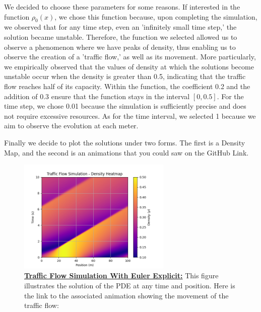 \documentclass{article}
\begin{document}
	We decided to choose these parameters for some reasons. If interested in the function $\rho_0(x)$, we chose this function because, upon completing the simulation, we observed that for any time step, even an 'infinitely small time step,' the solution became unstable. Therefore, the function we selected allowed us to observe a phenomenon where we have peaks of density, thus enabling us to observe the creation of a 'traffic flow,' as well as its movement. More particularly, we empirically observed that the values of density at which the solutions become unstable occur when the density is greater than 0.5, indicating that the traffic flow reaches half of its capacity. Within the function, the coefficient 0.2 and the addition of 0.3 ensure that the function stays in the interval $[0, 0.5]$.
	For the time step, we chose 0.01 because the simulation is sufficiently precise and does not require excessive resources. As for the time interval, we selected 1 because we aim to observe the evolution at each meter.
	
	Finally we decide to plot the solutions under two forms. The first is a Density Map, and the second is an animations that you could saw on the GitHub Link.
	
	\begin{figure}[H]
		\centering
		\includegraphics[width=0.65\textwidth]{traffic_flow_density_map.png}
		\caption[Traffic Flow Simulation With Euler Explicit]{\textbf{\underline{Traffic Flow Simulation With Euler Explicit:}} This figure illustrates the solution of the PDE at any time and position. Here is the link to the associated animation showing the movement of the traffic flow:  }
		\label{fig:traffic_flow_density_map}
	\end{figure}
	
\end{document}

